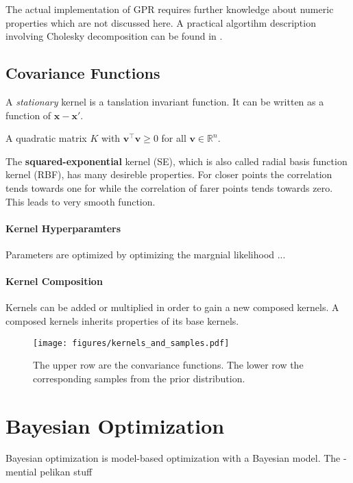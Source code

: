 \documentclass[english]{article}
\newcommand{\x}{\mathbf{x}}
\begin{document}
The actual implementation of \ac{GPR} requires further knowledge about numeric properties which are not discussed here. A practical algortihm description involving Cholesky decomposition can be found in \cite[Algorithm 2.1]{rasmussen_gaussian_2006}.




\subsection{Covariance Functions}

A \textit{stationary} kernel is a tanslation invariant function. It can be written as a function of $\x-\x'$.

A quadratic matrix $K$ with $\mathbf{v}^\top \mathbf{v} \ge 0$ for all $\mathbf{v} \in \mathbb{R}^n$.

The \textbf{squared-exponential} kernel (SE), which is also called radial basis function kernel (RBF), has many desireble properties. For closer points the correlation tends towards one for while the correlation of farer points tends towards zero. This leads to very smooth function.

\paragraph{Kernel Hyperparamters}
Parameters are optimized by optimizing the margnial likelihood ...

\paragraph{Kernel Composition}
Kernels can be added or multiplied in order to gain a new composed kernels. A composed kernels inherits properties of its base kernels.

\begin{figure}
  \texttt{[image: figures/kernels\_and\_samples.pdf]}
  \caption{The upper row are the convariance functions. The lower row the corresponding samples from the prior distribution.}
  \label{kernels_and_samples}
\end{figure}




\section{Bayesian Optimization}
Bayesian optimization is model-based optimization with a Bayesian model. The
- mential pelikan stuff
\end{document}
